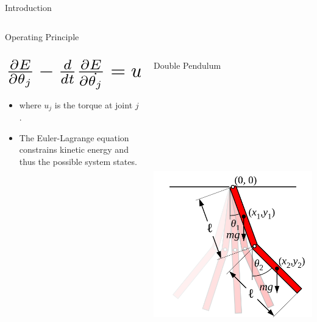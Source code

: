 \documentclass[final]{beamer}
\begin{document}
\begin{frame}{}
{\begin{columns}[t]
\begin{column}{.30\linewidth}
\begin{block}{\centering Introduction}
\begin{columns}[T]
\end{columns}
 
\end{block}
                
                

\begin{block}{\centering Operating Principle} 


\begin{columns}[T]
\begin{column}{16cm}{}
	\vspace{0.7cm}
\[ \scalebox{2.3}{$\frac{\partial E}{\partial \theta_j} - \frac{d}{dt}\frac{\partial E}{\partial \dot{\theta_j}} = u_j$}\]

\vspace{0.3cm}

\begin{itemize}
	\item where $u_j$ is the torque at joint $j$.
	\item The Euler-Lagrange equation constrains kinetic energy and thus the possible system states.
\end{itemize}
\end{column}
\begin{column}{16cm}{}
Double Pendulum
\centering\includegraphics[height=15cm, width = 15cm]{figures/double-pendulum.png}\\
\end{column}


\end{columns}
\end{block}
\end{column}
\end{columns}}
\end{frame}
\end{document}
